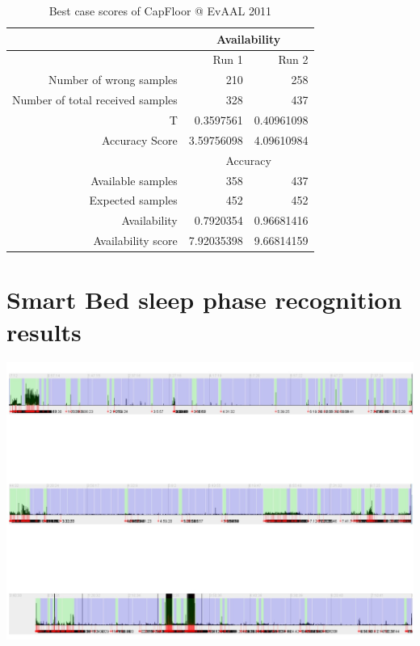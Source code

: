 \begin{table}[htbp]
  \centering
  \caption{Best case scores of CapFloor @ EvAAL 2011}
    \begin{tabular}{rrr}
    \toprule
          & \multicolumn{2}{c}{Availability} \\
    \midrule
          & Run 1 & Run 2 \\
    Number of wrong samples & 210   & 258 \\
    Number of total received samples & 328   & 437 \\
    T     & 0.3597561 & 0.40961098 \\
    Accuracy Score & 3.59756098 & 4.09610984 \\
        \midrule
          & \multicolumn{2}{c}{Accuracy} \\
    Available samples & 358   & 437 \\
    Expected samples & 452   & 452 \\
    Availability & 0.7920354 & 0.96681416 \\
    Availability score & 7.92035398 & 9.66814159 \\
    \bottomrule
    \end{tabular}%
  \label{tab:evalres_capfloor}%
\end{table}%

\section{Smart Bed sleep phase recognition results}
\begin{minipage}{\linewidth}
\centering
\includegraphics[width=1.0\textwidth]{images/eval_sleep_phase}
\label{fig:eval_sleep_phase}
\end{minipage}



